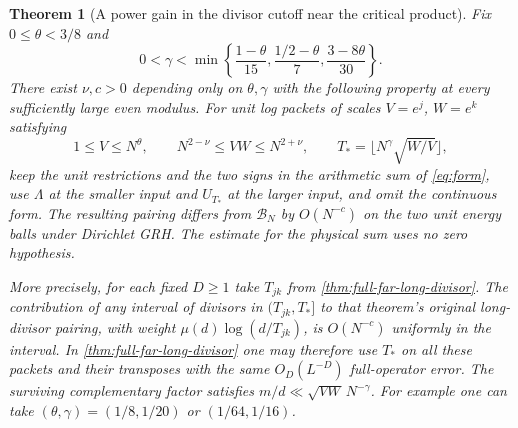 \documentclass[11pt,a4paper]{article}
\numberwithin{equation}{section}
\newtheorem{theorem}{Theorem}[section]
\newcommand{\B}{\mathcal B_N}
\begin{document}
\begin{theorem}[A power gain in the divisor cutoff near the critical product]
\label{thm:far-critical-inverse-band}
Fix $0\le\theta<3/8$ and
\begin{equation}
 0<\gamma<\min\left\{\frac{1-\theta}{15},
              \frac{1/2-\theta}{7},\frac{3-8\theta}{30}\right\}.
 \label{eq:far-critical-exponents}
\end{equation}
There exist $\nu,c>0$ depending only on $\theta,\gamma$ with the
following property at every sufficiently large even modulus. For
unit log packets of scales $V=e^j$, $W=e^k$ satisfying
\[
  1\le V\le N^\theta,\qquad N^{2-\nu}\le VW\le N^{2+\nu},
  \qquad T_*=\lfloor N^\gamma\sqrt{W/V}\rfloor ,
\]
keep the unit restrictions and the two signs in the arithmetic
sum of \eqref{eq:form}, use $\Lambda$ at the smaller input and
$U_{T_*}$ at the larger input, and omit the continuous form.
The resulting pairing differs from $\B$ by $O(N^{-c})$ on the
two unit energy balls under Dirichlet GRH. The estimate for the
physical sum uses no zero hypothesis.

More precisely, for each fixed $D\ge1$ take $T_{jk}$ from
\cref{thm:full-far-long-divisor}. The contribution of any
interval of divisors in $(T_{jk},T_*]$ to that theorem's
original long-divisor pairing, with weight $\mu(d)\log(d/T_{jk})$,
is $O(N^{-c})$ uniformly in the interval.
In \cref{thm:full-far-long-divisor} one may therefore use $T_*$
on all these packets and their transposes with the same
$O_D(L^{-D})$ full-operator error. The surviving complementary
factor satisfies $m/d\ll\sqrt{VW}\,N^{-\gamma}$. For example
one can take $(\theta,\gamma)=(1/8,1/20)$ or $(1/64,1/16)$.
\end{theorem}
\end{document}
